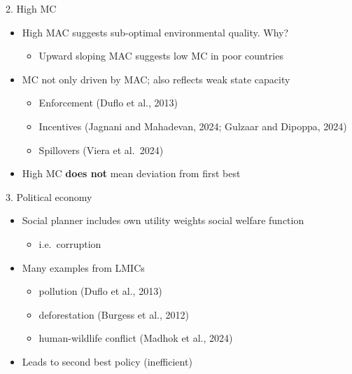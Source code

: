 \documentclass[
  ignorenonframetext,
  aspectratio=169]{beamer}
\providecommand{\tightlist}{%
  \setlength{\itemsep}{0pt}\setlength{\parskip}{0pt}}
\begin{document}
\begin{frame}{2. High MC}
\protect\hypertarget{high-mc}{}
\begin{itemize}
\tightlist
\item
  High MAC suggests sub-optimal environmental quality. Why?

  \begin{itemize}
  \tightlist
  \item
    Upward sloping MAC suggests low MC in poor countries
  \end{itemize}
\end{itemize}

\vfill

\begin{itemize}
\tightlist
\item
  MC not only driven by MAC; also reflects weak state capacity

  \begin{itemize}
  \tightlist
  \item
    Enforcement (Duflo et al., 2013)
  \item
    Incentives (Jagnani and Mahadevan, 2024; Gulzaar and Dipoppa, 2024)
  \item
    Spillovers (Viera et al.~2024)
  \end{itemize}
\end{itemize}

\vfill

\begin{itemize}
\tightlist
\item
  High MC \textbf{does not} mean deviation from first best
\end{itemize}
\end{frame}

\begin{frame}{3. Political economy}
\protect\hypertarget{political-economy}{}
\begin{itemize}
\tightlist
\item
  Social planner includes own utility weights social welfare function

  \begin{itemize}
  \tightlist
  \item
    i.e.~corruption \vfill
  \end{itemize}
\item
  Many examples from LMICs

  \begin{itemize}
  \tightlist
  \item
    pollution (Duflo et al., 2013)
  \item
    deforestation (Burgess et al., 2012)
  \item
    human-wildlife conflict (Madhok et al., 2024) \vfill
  \end{itemize}
\item
  Leads to second best policy (inefficient) \vfill
\end{itemize}
\end{frame}
\end{document}
